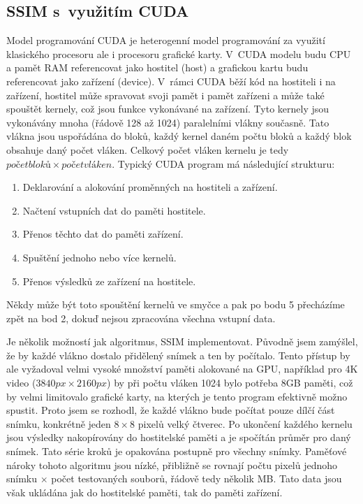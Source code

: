 \documentclass[thesis=M,czech]{FITthesis}[2016/06/26]
\begin{document}
\subsection{SSIM s~využitím CUDA} \label{ssim_cuda}
Model programování CUDA je heterogenní model programování za využití klasického procesoru ale i procesoru grafické karty. V~CUDA modelu budu CPU a pamět RAM referencovat jako hostitel (host) a grafickou kartu budu referencovat jako zařízení (device). V~rámci CUDA běží kód na hostiteli i na zařízení, hostitel může spravovat svoji pamět i pamět zařízeni a může také spouštět kernely, což jsou funkce vykonávané na zařízení. Tyto kernely jsou vykonávány mnoha (řádově 128 až 1024) paralelními vlákny současně. Tato vlákna jsou uspořádána do bloků, každý kernel daném počtu bloků a každý blok obsahuje daný počet vláken. Celkový počet vláken kernelu je tedy $počet bloků \times počet vláken$. Typický CUDA program má následující strukturu:
\begin{enumerate}
\item{Deklarování a alokování proměnných na hostiteli a zařízení.}
\item{Načtení vstupních dat do paměti hostitele.}
\item{Přenos těchto dat do paměti zařízení.}
\item{Spuštění jednoho nebo více kernelů.}
\item{Přenos výsledků ze zařízení na hostitele.}
\end{enumerate}
Někdy může být toto spouštění kernelů ve smyčce a pak po bodu 5 přecházíme zpět na bod 2, dokuď nejsou zpracována všechna vstupní data.

Je několik možností jak algoritmus, SSIM implementovat. Původně jsem zamýšlel, že by každé vlákno dostalo přidělený snímek a ten by počítalo. Tento přístup by ale vyžadoval velmi vysoké množství paměti alokované na GPU, například pro 4K video ($3840 px \times 2160 px$) by při počtu vláken 1024 bylo potřeba 8GB paměti, což by velmi limitovalo grafické karty, na kterých je tento program efektivně možno spustit. Proto jsem se rozhodl, že každé vlákno bude počítat pouze dílčí část snímku, konkrétně jeden $8 \times 8$ pixelů velký čtverec. Po ukončení každého kernelu jsou výsledky nakopírovány do hostitelské paměti a je spočítán průměr pro daný snímek. Tato série kroků je opakována postupně pro všechny snímky. Paměťové nároky tohoto algoritmu jsou nízké, přibližně se rovnají počtu pixelů jednoho snímku $\times$ počet testovaných souborů, řádově tedy několik MB. Tato data jsou však ukládána jak do hostitelské paměti, tak do paměti zařízení.
\end{document}
